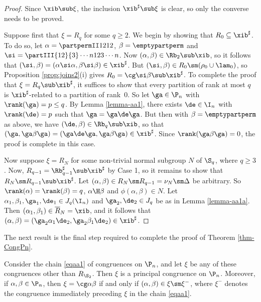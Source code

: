 \begin{proof}
Since $\xib\sub\xi$, the inclusion $\xib^\sharp\sub\xi$ is clear, so only the converse needs to be proved. 

\bigskip{} Suppose first that $\xi=R_q$ for some $q\geq 2$.  We begin by showing that $R_0\subseteq \xib^\sharp$.  To do so, let $\alpha=\partpermII1212$, $\beta=\emptypartperm$ and $\si=\partIII{12}{3}\cdots{n}{12}{3}\cdots{n}$.  Now $(\alpha,\beta)\in\Rb_2\sub\xib$, so it follows that $(\si,\beta)=(\alpha\si\alpha,\beta\si\beta)\in\xib^\sharp$.  But $(\si,\beta)\in R_0\sm(\rho_0\cup\lam_0)$, so Proposition \ref{prop:joins2}(i) gives $R_0=\cg\si\beta\sub\xib^\sharp$.  To complete the proof that $\xi=R_q\sub\xib^\sharp$, it suffices to show that every partition of rank at most $q$ is $\xib^\sharp$-related to a partition of rank~$0$.  So let $\ga\in\P_n$ with $\rank(\ga)=p\leq q$.  By Lemma \ref{lemma-aa1}, there exists $\de\in\I_n$ with $\rank(\de)=p$ such that $\ga=\ga\de\ga$.  But then with $\beta=\emptypartperm$ as above, we have $(\de,\beta)\in\Rb_q\sub\xib$, so that $(\ga,\ga\beta\ga)=(\ga\de\ga,\ga\beta\ga)\in\xib^\sharp$.  Since $\rank(\ga\beta\ga)=0$, the proof is complete in this case.

\bigskip{}  Now suppose $\xi=R_N$ for some non-trivial normal subgroup $N$ of $\S_q$, where $q\geq3$.  Now, $R_{q-1}=\Rb_{q-1}^\sharp\sub\xib^\sharp$ by Case 1, so it remains to show that $R_N\sm R_{q-1}\sub\xib^\sharp$.  
Let $(\alpha,\beta)\in R_N\sm R_{q-1}=\nu_N\sm \Delta$ be arbitrary.  So $\rank(\alpha)=\rank(\beta)=q$, $\alpha\H\beta$ and $\phi(\alpha,\beta)\in N$.  Let $\alpha_1,\beta_1,\ga_1,\de_1\in J_q(\I_n)$ and $\ga_2,\de_2\in J_q$ be as in Lemma \ref{lemma-aa1a}.  Then $(\alpha_1,\beta_1)\in \overline{R}_N=\xib$, and it follows that $(\alpha,\beta)=(\ga_2\alpha_1\de_2,\ga_2\beta_1\de_2)\in\xib^\sharp$. \end{proof}

The next result is the final step required to complete the proof of Theorem \ref{thm-CongPn}.

%
\begin{proposition}
\label{prop-aa3}
Consider the chain \eqref{eqaa1} of congruences on $\P_n$, and let $\xi$ be any of these congruences other than $R_{\S_2}$. Then $\xi$ is a principal congruence on $\P_n$.  Moreover, if $\alpha,\beta\in\P_n$, then $\xi=\cg\alpha\beta$ if and only if $(\alpha,\beta)\in\xi\sm\xi^-$, where $\xi^-$ denotes the congruence immediately preceding $\xi$ in the chain \eqref{eqaa1}.  
\end{proposition}

